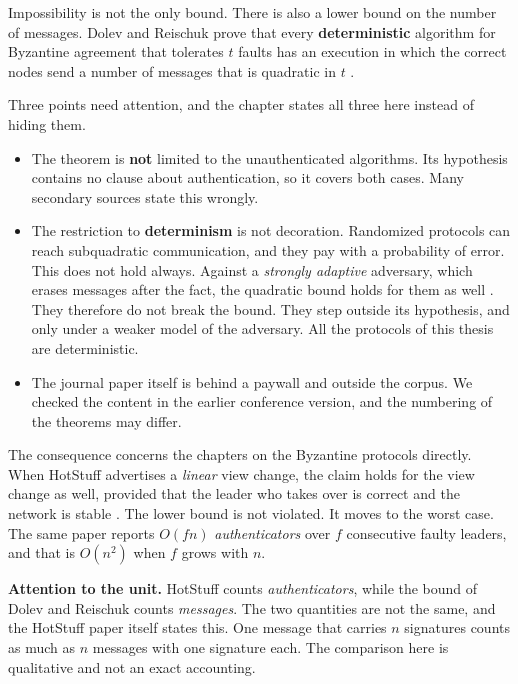 Impossibility is not the only bound. There is also a lower bound on the
number of messages. Dolev and Reischuk prove that every
\textbf{deterministic} algorithm for Byzantine agreement that tolerates
$t$ faults has an execution in which the correct nodes send a number of
messages that is quadratic in $t$ \cite{dolev1985bounds}.

Three points need attention, and the chapter states all three here
instead of hiding them.

\begin{itemize}
  \item The theorem is \textbf{not} limited to the unauthenticated
  algorithms. Its hypothesis contains no clause about authentication, so
  it covers both cases. Many secondary sources state this wrongly.
  \item The restriction to \textbf{determinism} is not decoration.
  Randomized protocols can reach subquadratic communication, and they
  pay with a probability of error. This does not hold always. Against a
  \emph{strongly adaptive} adversary, which erases messages after the
  fact, the quadratic bound holds for them as well
  \cite{abraham2019ccba}. They therefore do not break the bound. They
  step outside its hypothesis, and only under a weaker model of the
  adversary. All the protocols of this thesis are deterministic.
  \item The journal paper itself is behind a paywall and outside the
  corpus. We checked the content in the earlier conference version, and
  the numbering of the theorems may differ.
\end{itemize}

The consequence concerns the chapters on the Byzantine protocols
directly. When HotStuff advertises a \emph{linear} view change, the
claim holds for the view change as well, provided that the leader who
takes over is correct and the network is stable \cite{yin2019hotstuff}.
The lower bound is not violated. It moves to the worst case. The same
paper reports $O(fn)$ \emph{authenticators} over $f$ consecutive faulty
leaders, and that is $O(n^{2})$ when $f$ grows with $n$.

\textbf{Attention to the unit.} HotStuff counts \emph{authenticators},
while the bound of Dolev and Reischuk counts \emph{messages}. The two
quantities are not the same, and the HotStuff paper itself states this.
One message that carries $n$ signatures counts as much as $n$ messages
with one signature each. The comparison here is qualitative and not an
exact accounting.

